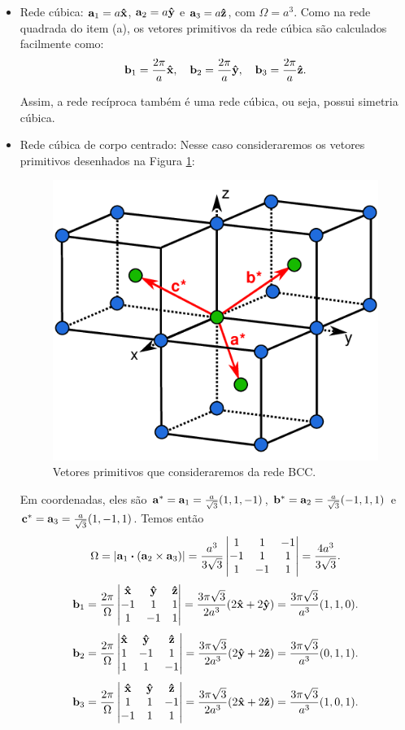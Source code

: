 \documentclass[a4paper,10pt]{article}
\begin{document}
\begin{itemize}
\item Rede cúbica: $\vb{a}_1 = a \vu{x}$, $\vb{a}_2 = a\vu{y}$ e $\vb{a}_3 = a\vu{z}$, com $\Omega = a^3$. Como na rede quadrada do item (a), os vetores primitivos da rede cúbica são calculados facilmente como:
$$
\vb{b}_1 = \frac{2\pi}{a} \vu{x}, \quad \vb{b}_2 = \frac{2\pi}{a} \vu{y}, \quad \vb{b}_3 = \frac{2\pi}{a} \vu{z}.
$$

Assim, a rede recíproca também é uma rede cúbica, ou seja, possui simetria cúbica.

\n

\item Rede cúbica de corpo centrado: Nesse caso consideraremos os vetores primitivos desenhados na Figura \ref{fig:bcc}:
\begin{figure}[H]
\centering
\includegraphics[width=0.4\linewidth]{fig/bcc.png}
\caption{Vetores primitivos que consideraremos da rede BCC.}
\label{fig:bcc}
\end{figure}

Em coordenadas, eles são $\vb{a}^* = \vb{a}_1 = \frac{a}{\sqrt{3}}(1, 1, -1)$, $\vb{b}^* = \vb{a}_2 = \frac{a}{\sqrt{3}}(-1, 1, 1)$ e $\vb{c}^* = \vb{a}_3 = \frac{a}{\sqrt{3}}(1, -1, 1)$. Temos então
$$
\Omega = \abs{\a_1 \vdot (\a_2 \times \a_3)} =
\frac{a^3}{3\sqrt{3}}
\begin{vmatrix}
1 & 1 & -1 \\
-1 & 1 & 1 \\
1 & -1 & 1 \\
\end{vmatrix}
=
\frac{4a^3}{3\sqrt{3}}.
$$
$$
\vb{b}_1 = \frac{2\pi}{\Omega}
\begin{vmatrix}
\vu{x} & \vu{y} & \vu{z} \\
-1 & 1 & 1 \\
1 & -1 & 1 \\
\end{vmatrix}
=
\frac{3\pi\sqrt{3}}{2a^3} (2\vu{x} + 2\vu{y}) = \frac{3\pi\sqrt{3}}{a^3} (1, 1, 0).
$$
$$
\vb{b}_2 = \frac{2\pi}{\Omega}
\begin{vmatrix}
\vu{x} & \vu{y} & \vu{z} \\
1 & -1 & 1 \\
1 & 1 & -1 \\
\end{vmatrix}
=
\frac{3\pi\sqrt{3}}{2a^3} (2\vu{y} + 2\vu{z}) = \frac{3\pi\sqrt{3}}{a^3} (0, 1, 1).
$$
$$
\vb{b}_3 = \frac{2\pi}{\Omega}
\begin{vmatrix}
\vu{x} & \vu{y} & \vu{z} \\
1 & 1 & -1 \\
-1 & 1 & 1 \\
\end{vmatrix}
=
\frac{3\pi\sqrt{3}}{2a^3} (2\vu{x} + 2\vu{z}) = \frac{3\pi\sqrt{3}}{a^3} (1, 0, 1).
$$


\end{itemize}
\end{document}
